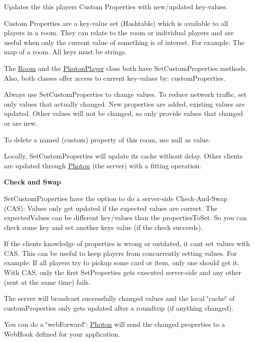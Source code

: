 Updates the this player\textquotesingle{}s Custom Properties with new/updated key-\/values. 

Custom Properties are a key-\/value set (Hashtable) which is available to all players in a room. They can relate to the room or individual players and are useful when only the current value of something is of interest. For example\+: The map of a room. All keys must be strings.

The \hyperlink{class_room}{Room} and the \hyperlink{class_photon_player}{Photon\+Player} class both have Set\+Custom\+Properties methods. Also, both classes offer access to current key-\/values by\+: custom\+Properties.

Always use Set\+Custom\+Properties to change values. To reduce network traffic, set only values that actually changed. New properties are added, existing values are updated. Other values will not be changed, so only provide values that changed or are new.

To delete a named (custom) property of this room, use null as value.

Locally, Set\+Custom\+Properties will update it\textquotesingle{}s cache without delay. Other clients are updated through \hyperlink{namespace_photon}{Photon} (the server) with a fitting operation.

{\bfseries Check and Swap}

Set\+Custom\+Properties have the option to do a server-\/side Check-\/\+And-\/\+Swap (C\+AS)\+: Values only get updated if the expected values are correct. The expected\+Values can be different key/values than the properties\+To\+Set. So you can check some key and set another key\textquotesingle{}s value (if the check succeeds).

If the client\textquotesingle{}s knowledge of properties is wrong or outdated, it can\textquotesingle{}t set values with C\+AS. This can be useful to keep players from concurrently setting values. For example\+: If all players try to pickup some card or item, only one should get it. With C\+AS, only the first Set\+Properties gets executed server-\/side and any other (sent at the same time) fails.

The server will broadcast successfully changed values and the local \char`\"{}cache\char`\"{} of custom\+Properties only gets updated after a roundtrip (if anything changed).

You can do a \char`\"{}web\+Forward\char`\"{}\+: \hyperlink{namespace_photon}{Photon} will send the changed properties to a Web\+Hook defined for your application.

